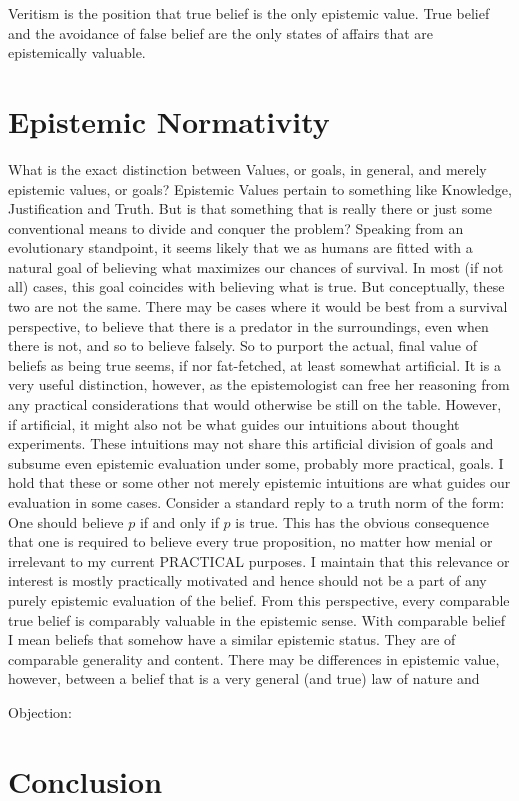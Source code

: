 \documentclass[11pt,numbers=noenddot]{scrartcl}
\begin{document}
Veritism is the position that true belief is the only epistemic value. True belief and the avoidance of false belief are the only states of affairs that are epistemically valuable.

\section{Epistemic Normativity}

What is the exact distinction between Values, or goals, in general, and merely epistemic values, or goals? Epistemic Values pertain to something like Knowledge, Justification and Truth. But is that something that is really there or just some conventional means to divide and conquer the problem? Speaking from an evolutionary standpoint, it seems likely that we as humans are fitted with a natural goal of believing what maximizes our chances of survival. In most (if not all) cases, this goal coincides with believing what is true. But conceptually, these two are not the same. There may be cases where it would be best from a survival perspective, to believe that there is a predator in the surroundings, even when there is not, and so to believe falsely. So to purport the actual, final value of beliefs as being true seems, if nor fat-fetched, at least somewhat artificial. It is a very useful distinction, however, as the epistemologist can free her reasoning from any practical considerations that would otherwise be still on the table. However, if artificial, it might also not be what guides our intuitions about thought experiments. These intuitions may not share this artificial division of goals and subsume even epistemic evaluation under some, probably more practical, goals. I hold that these or some other not merely epistemic intuitions are what guides our evaluation in some cases. Consider a standard reply to a truth norm of the form: One should believe $p$ if and only if $p$ is true. This has the obvious consequence that one is required to believe every true proposition, no matter how menial or irrelevant to my current PRACTICAL purposes. I maintain that this relevance or interest is mostly practically motivated and hence should not be a part of any purely epistemic evaluation of the belief. From this perspective, every comparable true belief is comparably valuable in the epistemic sense. With comparable belief I mean beliefs that somehow have a similar epistemic status. They are of comparable generality and content. There may be differences in epistemic value, however, between a belief that is a very general (and true) law of nature and

Objection: 

\nocite{sep-value-theory,Goldman2002-GOLTUO-2,James1896-JAMTWT-19,James1907-JAMP,Zagzebski2004-ZAGEVM-2,Berker2013-BERETA-2,Berker2013-BERTRO-24,Goldman2015-GOLRVA,Berker2015-BERRTG-2}

\section{Conclusion}

\end{document}
